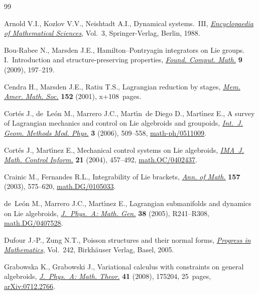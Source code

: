 \begin{thebibliography}{99}
\footnotesize\itemsep=0pt

Arnold V.I., Kozlov V.V., Neishtadt A.I., Dynamical systems.~{III},
 \href{https://doi.org/10.1007/978-3-662-02535-2}{\textit{Encyclopaedia of Mathematical Sciences}}, Vol.~3, Springer-Verlag,
 Berlin, 1988.

Bou-Rabee N., Marsden J.E., Hamilton--{P}ontryagin integrators on {L}ie groups.
 {I}.~{I}ntroduction and structure-preserving properties, \href{https://doi.org/10.1007/s10208-008-9030-4}{\textit{Found.
 Comput. Math.}} \textbf{9} (2009), 197--219.

Cendra H., Marsden J.E., Ratiu T.S., Lagrangian reduction by stages,
 \href{https://doi.org/10.1090/memo/0722}{\textit{Mem. Amer. Math. Soc.}} \textbf{152} (2001), x+108~pages.

Cort\'es J., de~Le\'on M., Marrero J.C., Mart\'{\i}n~de Diego D., Mart\'{\i}nez
 E., A survey of {L}agrangian mecha\-nics and control on {L}ie algebroids and
 groupoids, \href{https://doi.org/10.1142/S0219887806001211}{\textit{Int.~J. Geom. Methods Mod. Phys.}} \textbf{3} (2006),
 509--558, \mbox{\href{http://arxiv.org/abs/math-ph/0511009}{math-ph/0511009}}.

Cort\'es J., Mart\'{\i}nez E., Mechanical control systems on {L}ie algebroids,
 \href{https://doi.org/10.1093/imamci/21.4.457}{\textit{IMA~J. Math. Control Inform.}} \textbf{21} (2004), 457--492,
 \href{http://arxiv.org/abs/#2}{math.OC/0402437}.

Crainic M., Fernandes R.L., Integrability of {L}ie brackets, \href{https://doi.org/10.4007/annals.2003.157.575}{\textit{Ann. of
 Math.}} \textbf{157} (2003), 575--620, \href{http://arxiv.org/abs/math.DG/0105033}{math.DG/0105033}.

de~Le\'on M., Marrero J.C., Mart\'{\i}nez E., Lagrangian submanifolds and
 dynamics on {L}ie algebroids, \href{https://doi.org/10.1088/0305-4470/38/24/R01}{\textit{J.~Phys.~A: Math. Gen.}} \textbf{38}
 (2005), R241--R308, \href{http://arxiv.org/abs/math.DG/0407528}{math.DG/0407528}.

Dufour J.-P., Zung N.T., Poisson structures and their normal forms,
 \href{https://doi.org/10.1007/b137493}{\textit{Progress in Mathematics}}, Vol.~242, Birkh\"auser Verlag, Basel, 2005.

Grabowska K., Grabowski J., Variational calculus with constraints on general
 algebroids, \href{https://doi.org/10.1088/1751-8113/41/17/175204}{\textit{J.~Phys.~A: Math. Theor.}} \textbf{41} (2008), 175204,
 25~pages, \href{http://arxiv.org/abs/0712.2766}{arXiv:0712.2766}.


\end{thebibliography}
